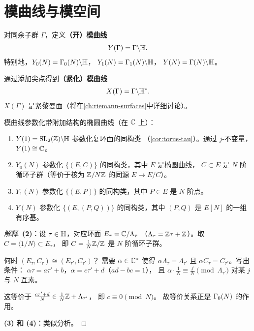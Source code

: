 \section{模曲线与模空间}
\label{sec:modular-curves-moduli}

\begin{definition}[模曲线]
\label{def:modular-curves}
对同余子群 $\Gamma$，定义\textbf{（开）模曲线}
\[
  Y(\Gamma) = \Gamma \backslash \mathbb{H}.
\]
特别地，$Y_0(N) = \Gamma_0(N) \backslash \mathbb{H}$，
$Y_1(N) = \Gamma_1(N) \backslash \mathbb{H}$，
$Y(N) = \Gamma(N) \backslash \mathbb{H}$。

通过添加尖点得到\textbf{（紧化）模曲线}
\[
  X(\Gamma) = \Gamma \backslash \mathbb{H}^*.
\]
$X(\Gamma)$ 是紧黎曼面（将在\cref{ch:riemann-surfaces}中详细讨论）。
\end{definition}

\begin{theorem}[模诠释]
\label{thm:moduli-interpretation}
模曲线参数化带附加结构的椭圆曲线（在 $\mathbb{C}$ 上）：
\begin{enumerate}
  \item $Y(1) = \mathrm{SL}_2(\mathbb{Z}) \backslash \mathbb{H}$ 参数化复环面的同构类
    （\cref{cor:torus-tau}）。通过 $j$-不变量，$Y(1) \cong \mathbb{C}$。
  \item $Y_0(N)$ 参数化 $\{(E, C)\}$ 的同构类，其中 $E$ 是椭圆曲线，
    $C \subset E$ 是 $N$ 阶循环子群（等价于核为 $\mathbb{Z}/N\mathbb{Z}$ 的同源
    $E \to E/C$）。
  \item $Y_1(N)$ 参数化 $\{(E, P)\}$ 的同构类，其中 $P \in E$ 是
    $N$ 阶点。
  \item $Y(N)$ 参数化 $\{(E, (P, Q))\}$ 的同构类，其中 $(P, Q)$ 是
    $E[N]$ 的一组有序基。
\end{enumerate}
\end{theorem}

\begin{proof}[解释]
\textbf{(2)}：设 $\tau \in \mathbb{H}$，对应环面 $E_\tau = \mathbb{C}/\Lambda_\tau$
（$\Lambda_\tau = \mathbb{Z}\tau + \mathbb{Z}$）。取 $C = \langle 1/N \rangle \subset E_\tau$，
即 $C = \frac{1}{N}\mathbb{Z}/\mathbb{Z}$ 是 $N$ 阶循环子群。

何时 $(E_\tau, C_\tau) \cong (E_{\tau'}, C_{\tau'})$？
需要 $\alpha \in \mathbb{C}^*$ 使得 $\alpha\Lambda_\tau = \Lambda_{\tau'}$
且 $\alpha C_\tau = C_{\tau'}$。写出条件：
$\alpha\tau = a\tau' + b$，$\alpha = c\tau' + d$（$ad - bc = 1$），
且 $\alpha \cdot \frac{1}{N} \equiv \frac{j}{N} \pmod{\Lambda_{\tau'}}$
对某 $j$ 与 $N$ 互素。

这等价于 $\frac{c\tau' + d}{N} \in \frac{1}{N}\mathbb{Z} + \Lambda_{\tau'}$，
即 $c \equiv 0 \pmod{N}$。
故等价关系正是 $\Gamma_0(N)$ 的作用。

\textbf{(3) 和 (4)}：类似分析。
\end{proof}


